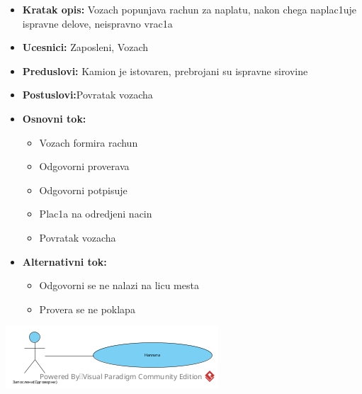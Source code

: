 \begin{itemize}
	\item {\textbf{Kratak opis:}  Vozach popunjava rachun za naplatu, nakon chega naplac1uje ispravne delove, neispravno vrac1a}
	\item{\textbf{Ucesnici:} Zaposleni, Vozach }
	\item{\textbf{Preduslovi:} Kamion je istovaren, prebrojani su ispravne sirovine }
	\item{\textbf{Postuslovi:}Povratak vozacha}
	\item{\textbf{Osnovni tok:}  \begin{itemize}
				\item {Vozach formira rachun}
				\item {Odgovorni proverava}
				\item {Odgovorni potpisuje}
				\item {Plac1a na odredjeni nacin}
				\item {Povratak vozacha}
	\end{itemize}}
\item{\textbf{Alternativni tok:} \begin{itemize}
		\item {Odgovorni se ne nalazi na licu mesta}
		\item{Provera se ne poklapa}
\end{itemize}}
\end{itemize}
\includegraphics{Slike/SUnaplata.jpg}